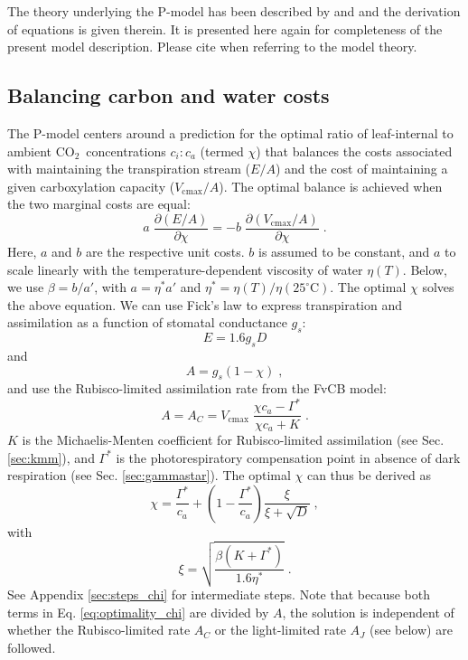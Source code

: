 \documentclass{myreport}
\newcommand{\coo}{CO$_2$}
\begin{document}
The theory underlying the P-model has been described by \cite{prentice14ecollett} and \cite{wang17natpl} and the derivation of equations is given therein. It is presented here again for completeness of the present model description. Please cite \cite{wang17natpl} when referring to the model theory. 

\subsection{Balancing carbon and water costs}
\label{sec:watercarbon}
The P-model centers around a prediction for the optimal ratio of leaf-internal to ambient \coo\ concentrations $c_i:c_a$ (termed $\chi$) that balances the costs associated with maintaining the transpiration stream ($E/A$) and the cost of maintaining a given carboxylation capacity ($V_{\mathrm{cmax}}/A$). The optimal balance is achieved when the two marginal costs are equal: 
\begin{equation}
\label{eq:optimality_chi}
a \; \frac{\partial (E/A)}{\partial \chi} = -b \; \frac{\partial (V_{\mathrm{cmax}}/A)}{\partial \chi}\;.
\end{equation}
Here, $a$ and $b$ are the respective unit costs. $b$ is assumed to be constant, and $a$ to scale linearly with the temperature-dependent viscosity of water $\eta(T)$. Below, we use $\beta = b / a'$, with $a = \eta^\ast a'$ and $\eta^\ast = \eta(T) / \eta(25^{\circ}\text{C})$. The optimal $\chi$ solves the above equation. We can use Fick's law \citep{fick1855} to express transpiration and assimilation as a function of stomatal conductance $g_s$: 
\begin{equation}
\label{eq:egs}
    E = 1.6 g_s D
\end{equation}
and 
\begin{equation}
\label{eq:ags}
    A = g_s (1-\chi) \;,
\end{equation}
and use the Rubisco-limited assimilation rate from the FvCB model:
\begin{equation}
\label{eq:ac}
    A = A_C = V_{\mathrm{cmax}} \; \frac{\chi c_a - \Gamma^{\ast}}{\chi c_a + K}\;.
\end{equation}
$K$ is the Michaelis-Menten coefficient for Rubisco-limited assimilation (see Sec. \ref{sec:kmm}), and $\Gamma^{\ast}$ is the photorespiratory compensation point in absence of dark respiration (see Sec. \ref{sec:gammastar}). The optimal $\chi$ can thus be derived as
\begin{equation}
\label{eq:chiopt}
\chi = \frac{\Gamma^{\ast}}{c_a} + \left(1- \frac{\Gamma^{\ast}}{c_a}\right) \frac{\xi}{\xi + \sqrt{D}}\;,
\end{equation}
with 
\begin{equation}
\label{eq:xi}
\xi = \sqrt{\frac{\beta (K+\Gamma^{\ast})}{1.6 \eta^{\ast}}}\;.
\end{equation}
See Appendix \ref{sec:steps_chi} for intermediate steps. Note that because both terms in Eq. \ref{eq:optimality_chi} are divided by $A$, the solution is independent of whether the Rubisco-limited rate $A_C$ or the light-limited rate $A_J$ (see below) are followed. 
\end{document}
